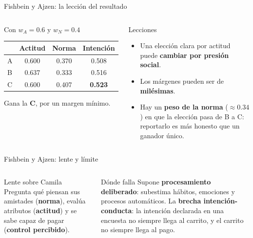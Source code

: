 \documentclass[aspectratio=169,xcolor=dvipsnames]{beamer}
\begin{document}
\begin{frame}{Fishbein y Ajzen: la lección del resultado}
\begin{columns}[T]
  \begin{block}{Con $w_A=0.6$ y $w_N=0.4$}
    \small
    \begin{center}
    \begin{tabular}{@{}lccc@{}}
    \toprule
     & Actitud & Norma & Intención \\
    \midrule
    A & 0.600 & 0.370 & 0.508 \\
    B & 0.637 & 0.333 & 0.516 \\
    C & 0.600 & 0.407 & \textbf{0.523} \\
    \bottomrule
    \end{tabular}
    \end{center}
    \footnotesize Gana la \textbf{C}, por un margen mínimo.
  \end{block}
  \begin{alertblock}{Lecciones}
    \small
    \begin{itemize}
      \item Una elección clara por actitud puede \textbf{cambiar por presión social}.
      \item Los márgenes pueden ser de \textbf{milésimas}.
      \item Hay un \textbf{peso de la norma} ($\approx0.34$) en que la elección pasa de B a C: reportarlo es más honesto que un ganador único.
    \end{itemize}
  \end{alertblock}
\end{columns}
\end{frame}

\begin{frame}{Fishbein y Ajzen: lente y límite}
\begin{columns}[T]
  \begin{alertblock}{Lente sobre Camila}
    \small Pregunta qué piensan sus amistades (\textbf{norma}), evalúa atributos (\textbf{actitud}) y se sabe capaz de pagar (\textbf{control percibido}).
  \end{alertblock}
  \begin{block}{Dónde falla}
    \small Supone \textbf{procesamiento deliberado}: subestima hábitos, emociones y procesos automáticos. La \textbf{brecha intención-conducta}: la intención declarada en una encuesta no siempre llega al carrito, y el carrito no siempre llega al pago.
  \end{block}
\end{columns}
\end{frame}
\end{document}
